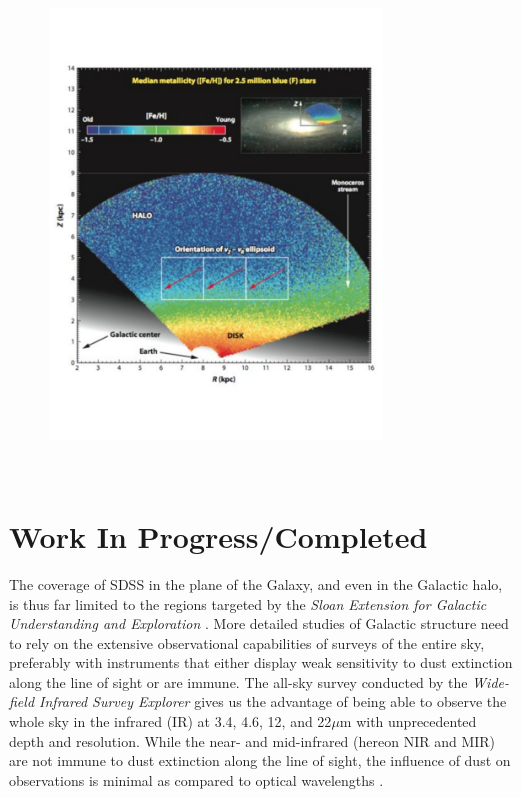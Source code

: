\begin{figure}[h]
\begin{minipage}{0.9\textwidth}
{\begin{minipage}[l]{3in}
      \end{minipage}\ \hfill \
      \begin{minipage}[r]{3in}
	\includegraphics[height=4.5in]{figs/IBJ_fig5.pdf}

      \end{minipage} \ \hfill \
}
\end{minipage}
\vspace{-10pt}
\end{figure}


\section{Work In Progress/Completed}
\label{sec:completedWork}
The coverage of SDSS in the plane of the Galaxy, and even in the Galactic halo, is thus far limited to the regions targeted by the \emph{Sloan Extension for Galactic Understanding and Exploration} \citep[SEGUE, ][]{2012ApJ...757..166B}. More detailed studies of Galactic structure need to rely on the extensive observational capabilities of surveys of the entire sky, preferably with instruments that either display weak sensitivity to dust extinction along the line of sight or are immune. The all-sky survey conducted by the \emph{Wide-field Infrared Survey Explorer} \citep[WISE,][]{2012wise.rept....1C} gives us the advantage of being able to observe the whole sky in the infrared (IR) at 3.4, 4.6, 12, and 22$\mu$m with unprecedented depth and resolution. While the near- and mid-infrared (hereon NIR and MIR) are not immune to dust extinction along the line of sight, the influence of dust on observations is minimal as compared to optical wavelengths \citep{2012ApJ...757..166B}. 

